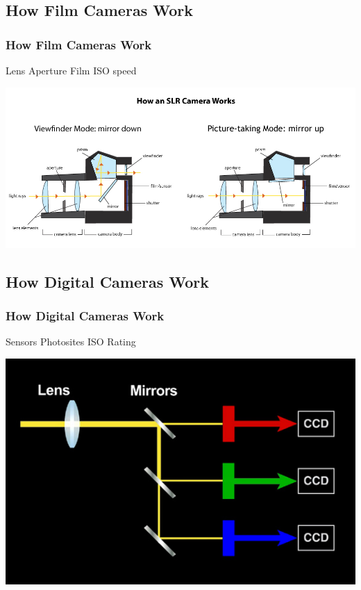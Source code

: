 \documentclass{beamer}
\begin{document}
			\subsection{How Film Cameras Work}		
\begin{frame}
	\frametitle{How Film Cameras Work}
	\begin{outline}
		\1 Lens
		\1 Aperture
		\1 Film ISO speed
	\end{outline}
	\begin{center}
		\includegraphics[width=1.0\textwidth]{images/How Camera Works.jpg}
	\end{center}
\end{frame}

			\subsection{How Digital Cameras Work}		
\begin{frame}
	\frametitle{How Digital Cameras Work}
	\begin{outline}
		\1 Sensors
		\1 Photosites
		\1 ISO Rating
	\end{outline}
	\begin{center}
		\includegraphics[width=1.0\textwidth]{images/digital-camera-work.jpg}
	\end{center}
\end{frame}
			
\end{document}
